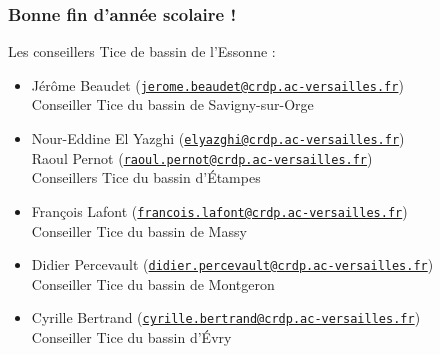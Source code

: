 \documentclass[french]{beamer}
\newcommand{\email}[1]{\href{mailto:#1}{\smaller\nolinkurl{#1}}}
\begin{document}
\begin{frame}%
\frametitle{Bonne fin d'année scolaire !}

Les conseillers Tice de bassin de l'Essonne :
\begin{itemize}
\item Jérôme Beaudet (\email{jerome.beaudet@crdp.ac-versailles.fr})\\
Conseiller Tice du bassin de Savigny-sur-Orge

\item Nour-Eddine El Yazghi (\email{elyazghi@crdp.ac-versailles.fr})\\
Raoul Pernot (\email{raoul.pernot@crdp.ac-versailles.fr}) \\
Conseillers Tice du bassin d’Étampes

\item François Lafont (\email{francois.lafont@crdp.ac-versailles.fr})\\
Conseiller Tice du bassin de Massy

\item Didier Percevault ({\smaller\email{didier.percevault@crdp.ac-versailles.fr}})\\
Conseiller Tice du bassin de Montgeron

\item Cyrille Bertrand (\email{cyrille.bertrand@crdp.ac-versailles.fr})\\
Conseiller Tice du bassin d’Évry
\end{itemize}

\end{frame}
\end{document}
